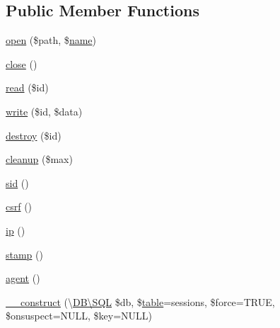 \subsection*{Public Member Functions}
\begin{DoxyCompactItemize}
\item 
\hyperlink{class_d_b_1_1_s_q_l_1_1_session_a037c59224bcb347b69ca61df88ef7230}{open} (\$path, \$\hyperlink{class_d_b_1_1_s_q_l_a4b516aaa5fa38da4fed24ab6001627e2}{name})
\item 
\hyperlink{class_d_b_1_1_s_q_l_1_1_session_aa69c8bf1f1dcf4e72552efff1fe3e87e}{close} ()
\item 
\hyperlink{class_d_b_1_1_s_q_l_1_1_session_afa59bebedda70c37b94c2efc35da83f3}{read} (\$id)
\item 
\hyperlink{class_d_b_1_1_s_q_l_1_1_session_a5f277b5f0e4e2154cddc9a3a0d2bf57d}{write} (\$id, \$data)
\item 
\hyperlink{class_d_b_1_1_s_q_l_1_1_session_a726fa8a4b4b187b9ca32ba427aac8137}{destroy} (\$id)
\item 
\hyperlink{class_d_b_1_1_s_q_l_1_1_session_a60b027eb0df6d42b8fe2ec8c93cfbbae}{cleanup} (\$max)
\item 
\hyperlink{class_d_b_1_1_s_q_l_1_1_session_a30b416c35150ab6bdde364f527f612bd}{sid} ()
\item 
\hyperlink{class_d_b_1_1_s_q_l_1_1_session_a048d24aa22a28f92f1f3a7e3d323f45e}{csrf} ()
\item 
\hyperlink{class_d_b_1_1_s_q_l_1_1_session_a197bae3714812901860bd006b00f91de}{ip} ()
\item 
\hyperlink{class_d_b_1_1_s_q_l_1_1_session_ab0b8b94527259f4aacdf1fd45411abfe}{stamp} ()
\item 
\hyperlink{class_d_b_1_1_s_q_l_1_1_session_a77f6a261d70e66c7b7273774832482dc}{agent} ()
\item 
\hyperlink{class_d_b_1_1_s_q_l_1_1_session_acfaeaa649a2bb634903b84ebbb1515f3}{\+\_\+\+\_\+construct} (\textbackslash{}\hyperlink{class_d_b_1_1_s_q_l}{D\+B\textbackslash{}\+S\+QL} \$db, \$\hyperlink{class_d_b_1_1_s_q_l_1_1_mapper_a5aa7b43c8ec77df216a71a27da0a321c}{table}=\textquotesingle{}sessions\textquotesingle{}, \$force=T\+R\+UE, \$onsuspect=N\+U\+LL, \$key=N\+U\+LL)
\end{DoxyCompactItemize}
